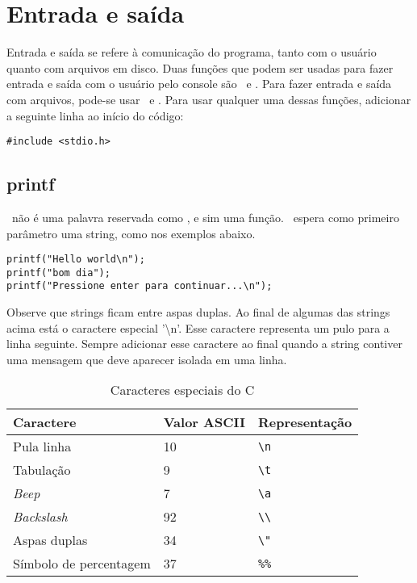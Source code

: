 
\chapter{Entrada e saída}

Entrada e saída se refere à comunicação do programa, tanto com o usuário quanto com arquivos em disco. 
Duas funções que podem ser usadas para fazer entrada e saída com o usuário pelo console são \PRINTF\ e \SCANF. 
Para fazer entrada e saída com arquivos, pode-se usar \FPRINTF\ e \FSCANF. 
Para usar qualquer uma dessas funções, adicionar a seguinte linha ao início do código:

\begin{lstlisting}
#include <stdio.h> 
\end{lstlisting}



\section{printf}
\label{sec:printf}

\PRINTF\ não é uma palavra reservada como \WHILE, e sim uma função. \PRINTF\ espera como primeiro parâmetro uma string, como nos exemplos abaixo.

\begin{lstlisting}
printf("Hello world\n");
printf("bom dia");
printf("Pressione enter para continuar...\n");
\end{lstlisting}

Observe que strings ficam entre aspas duplas. Ao final de algumas das strings acima está o caractere especial '\textbackslash n'. Esse caractere representa um pulo para a linha seguinte. Sempre adicionar esse caractere ao final quando a string contiver uma mensagem que deve aparecer isolada em uma linha. 


\begin{table}
\centering
  \begin{tabular}{|l|l|l|}
    \hline
        Caractere               & Valor ASCII & Representação \\
    \hline
        Pula linha              & 10          & \verb|\n|     \\
        Tabulação               & 9           & \verb|\t|     \\
        {\it Beep}              & 7           & \verb|\a|     \\
        {\it Backslash}         & 92          & \verb|\\|     \\
        Aspas duplas            & 34          & \verb|\"|     \\
        Símbolo de percentagem  & 37          & \verb|%%|     \\
    \hline
  \end{tabular}
  \caption{Caracteres especiais do C}
  \label{tab:chars}
\end{table}


